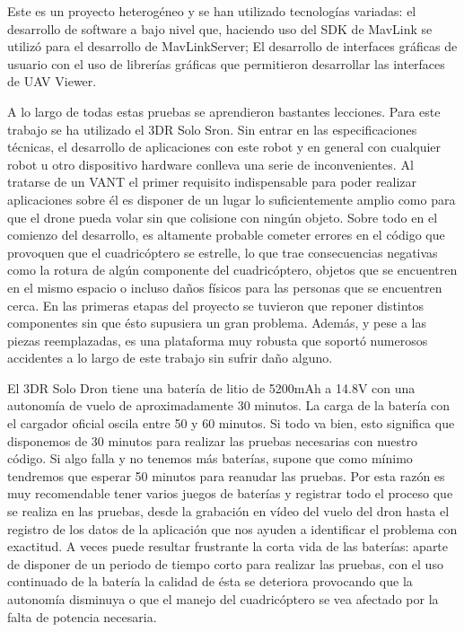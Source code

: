 Este es un proyecto heterogéneo y se han utilizado tecnologías variadas: el desarrollo de software a bajo nivel que, haciendo uso del SDK de MavLink se utilizó para el desarrollo de MavLinkServer; El desarrollo de interfaces gráficas de usuario con el uso de librerías gráficas que permitieron desarrollar las interfaces de UAV Viewer.

A lo largo de todas estas pruebas se aprendieron bastantes lecciones. Para este trabajo se ha utilizado el 3DR Solo Sron. Sin entrar en las especificaciones técnicas, el desarrollo de aplicaciones con este robot y en general con cualquier robot u otro dispositivo hardware conlleva una serie de inconvenientes. Al tratarse de un VANT el primer requisito indispensable para poder realizar aplicaciones sobre él es disponer de un lugar lo suficientemente amplio como para que el drone pueda volar sin que colisione con ningún objeto. Sobre todo en el comienzo del desarrollo, es altamente probable cometer errores en el código que provoquen que el cuadricóptero se estrelle, lo que trae consecuencias negativas como la rotura de algún componente del cuadricóptero, objetos que se encuentren en el mismo espacio o incluso daños físicos para las personas que se encuentren cerca. En las primeras etapas del proyecto se tuvieron que reponer distintos componentes sin que ésto supusiera un gran problema. Además, y pese a las piezas reemplazadas, es una plataforma muy robusta que soportó numerosos accidentes a lo largo de este trabajo sin sufrir daño alguno.

El 3DR Solo Dron tiene una batería de litio de 5200mAh a 14.8V con una autonomía de vuelo de aproximadamente 30 minutos. La carga de la batería con el cargador oficial oscila entre 50 y 60 minutos. Si todo va bien, esto significa que disponemos de 30 minutos para realizar las pruebas necesarias con nuestro código. Si algo falla y no tenemos más baterías, supone que como mínimo tendremos que
esperar 50 minutos para reanudar las pruebas. Por esta razón es muy recomendable tener varios juegos de baterías y registrar todo el proceso que se realiza en las pruebas, desde la grabación en vídeo del vuelo del dron hasta el registro de los datos de la aplicación que nos ayuden a identificar el problema con exactitud. A veces puede resultar frustrante la corta vida de las baterías: aparte de disponer de un periodo de tiempo corto para realizar las pruebas, con el uso continuado de la batería la calidad de ésta se deteriora
provocando que la autonomía disminuya o que el manejo del cuadricóptero se vea afectado por la falta de potencia necesaria.

